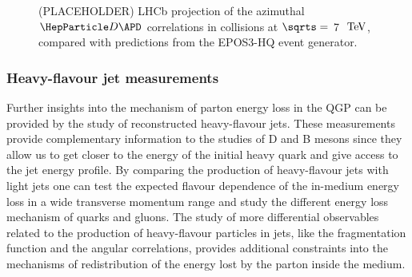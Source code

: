 \begin{figure}
\centering
{}
\caption{(PLACEHOLDER) LHCb projection of the azimuthal $\PD \APD$ correlations in \pp collisions at $\sqrts=$ 7 $~\text{TeV}$, compared with predictions from the EPOS3-HQ event generator.}
\label{fig:DD}
\end {figure}


\subsubsection{Heavy-flavour jet measurements}
Further insights into the mechanism of parton energy loss in the QGP can be provided by the study of reconstructed heavy-flavour jets. These measurements provide complementary information to the studies of D and B mesons since they allow us to get closer to the energy of the initial heavy quark and give access to the jet energy profile. By comparing the production of heavy-flavour jets with light jets one can test the expected flavour dependence of the in-medium energy loss in a wide transverse momentum range and study the different energy loss mechanism of quarks and gluons. The study of more differential observables related to the production of heavy-flavour particles in jets, like the fragmentation function and the angular correlations, provides additional constraints into the mechanisms of redistribution of the energy lost by the parton inside the medium. %



